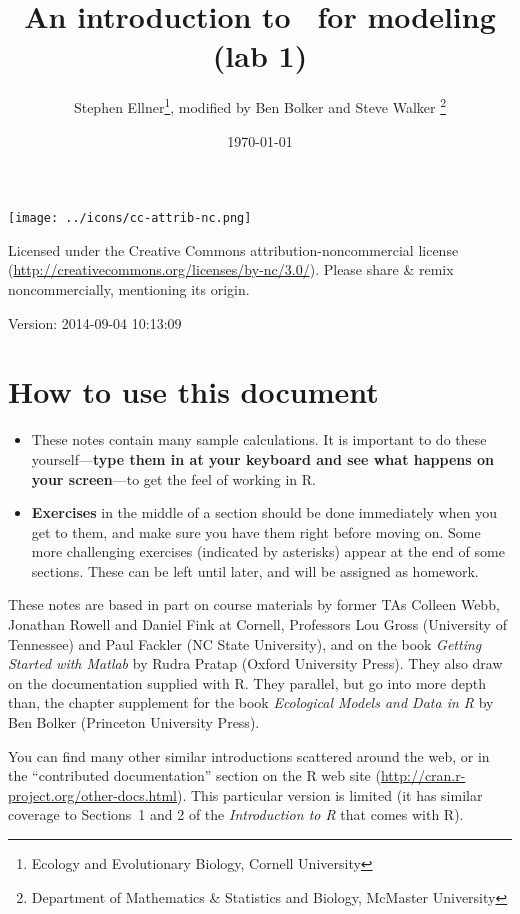 \documentclass[11pt]{article}\usepackage[]{graphicx}\usepackage[]{color}
\title{An introduction to \R\ for modeling (lab 1)}
\date{\today}
\author{Stephen Ellner\thanks{Ecology and Evolutionary Biology,
    Cornell University}, modified by Ben Bolker and Steve Walker
  \thanks{Department of Mathematics \& Statistics and Biology,
    McMaster University}}
\newcommand\R{{\sf R}}
\newcounter{exercise}
\numberwithin{exercise}{section}
\begin{document}
\maketitle

\texttt{[image: ../icons/cc-attrib-nc.png]}

\begin{minipage}[b]{3in}
{\small Licensed under the Creative Commons 
  attribution-noncommercial license
(\url{http://creativecommons.org/licenses/by-nc/3.0/}).
Please share \& remix noncommercially,
mentioning its origin.}
\end{minipage}

Version: 2014-09-04 10:13:09
  
\addtocounter{section}{-1}
\section{How to use this document}





\begin{itemize}
\item These notes contain many sample calculations. It is important to 
do these yourself---\textbf{type them in at your keyboard and see what
happens on your screen}---to get the 
feel of working in \R. 
\item \textbf{Exercises} in the middle of a section should be done
immediately when you get to them, and make sure you have them right 
before moving on. Some more challenging exercises 
(indicated by asterisks) appear at the end of some sections. These
can be left until later, and will be assigned as homework.   
\end{itemize}

These notes are based in part on course materials by former TAs
Colleen Webb, Jonathan Rowell and Daniel Fink at Cornell, Professors
Lou Gross (University of Tennessee) and Paul Fackler (NC State
University), and on the book \emph{Getting Started with Matlab} by
Rudra Pratap (Oxford University Press).  They also draw on the
documentation supplied with \R.  They parallel, but go into 
more depth than, the chapter supplement for the book
\emph{Ecological Models and Data in \R} by Ben Bolker (Princeton University Press).

You can find many other similar introductions scattered around the
web, or in the ``contributed documentation'' section on the R web site
(\url{http://cran.r-project.org/other-docs.html}).  This particular
version is limited (it has similar coverage to Sections~1 and 2 of the
\emph{Introduction to \R} that comes with \R).
\end{document}
